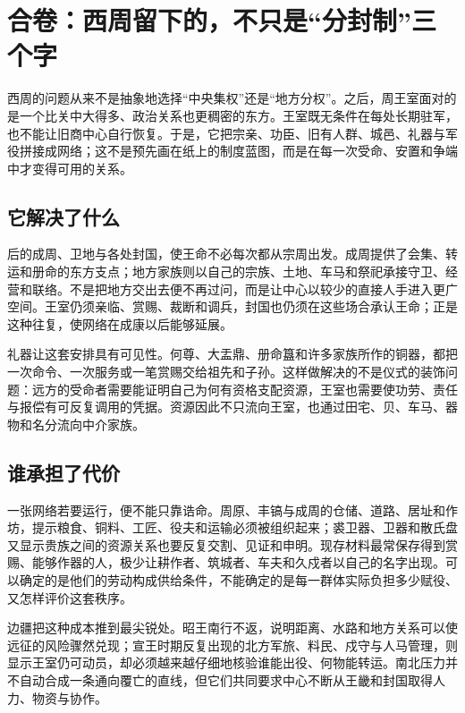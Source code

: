 \section{合卷：西周留下的，不只是“分封制”三个字}

西周的问题从来不是抽象地选择“中央集权”还是“地方分权”。之后，周王室面对的是一个比关中大得多、政治关系也更稠密的东方。王室既无条件在每处长期驻军，也不能让旧商中心自行恢复。于是，它把宗亲、功臣、旧有人群、城邑、礼器与军役拼接成网络；这不是预先画在纸上的制度蓝图，而是在每一次受命、安置和争端中才变得可用的关系。

\subsection{它解决了什么}

后的成周、卫地与各处封国，使王命不必每次都从宗周出发。成周提供了会集、转运和册命的东方支点；地方家族则以自己的宗族、土地、车马和祭祀承接守卫、经营和联络。不是把地方交出去便不再过问，而是让中心以较少的直接人手进入更广空间。王室仍须亲临、赏赐、裁断和调兵，封国也仍须在这些场合承认王命；正是这种往复，使网络在成康以后能够延展。

礼器让这套安排具有可见性。何尊、大盂鼎、册命簋和许多家族所作的铜器，都把一次命令、一次服务或一笔赏赐交给祖先和子孙。这样做解决的不是仪式的装饰问题：远方的受命者需要能证明自己为何有资格支配资源，王室也需要使功劳、责任与报偿有可反复调用的凭据。资源因此不只流向王室，也通过田宅、贝、车马、器物和名分流向中介家族。

\subsection{谁承担了代价}

一张网络若要运行，便不能只靠诰命。周原、丰镐与成周的仓储、道路、居址和作坊，提示粮食、铜料、工匠、役夫和运输必须被组织起来；裘卫器、卫器和散氏盘又显示贵族之间的资源关系也要反复交割、见证和申明。现存材料最常保存得到赏赐、能够作器的人，极少让耕作者、筑城者、车夫和久戍者以自己的名字出现。可以确定的是他们的劳动构成供给条件，不能确定的是每一群体实际负担多少赋役、又怎样评价这套秩序。

边疆把这种成本推到最尖锐处。昭王南行不返，说明距离、水路和地方关系可以使远征的风险骤然兑现；宣王时期反复出现的北方军旅、料民、戍守与人马管理，则显示王室仍可动员，却必须越来越仔细地核验谁能出役、何物能转运。南北压力并不自动合成一条通向覆亡的直线，但它们共同要求中心不断从王畿和封国取得人力、物资与协作。

